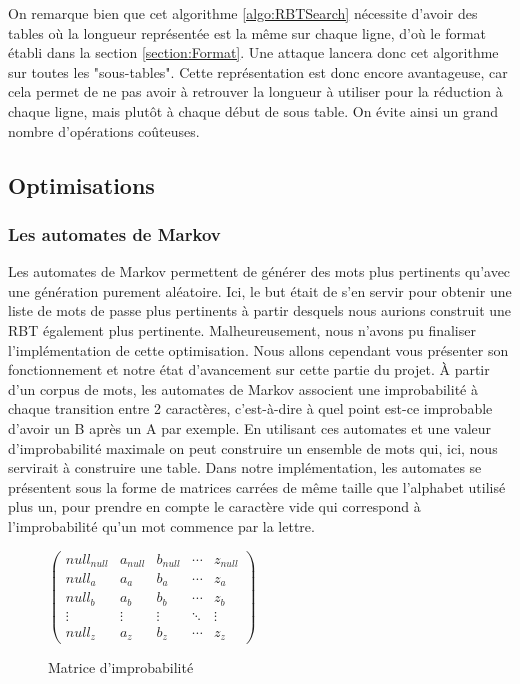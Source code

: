 \documentclass[french,12pt]{article}
\begin{document}
        \indent On remarque bien que cet algorithme \ref{algo:RBTSearch} nécessite d'avoir des tables où la longueur représentée est la même sur chaque ligne, d'où le format établi dans la section \ref{section:Format}. Une attaque lancera donc cet algorithme sur toutes les "sous-tables". Cette représentation est donc encore avantageuse, car cela permet de ne pas avoir à retrouver la longueur à utiliser pour la réduction à chaque ligne, mais plutôt à chaque début de sous table. On évite ainsi un grand nombre d'opérations coûteuses.
        \subsection{Optimisations}
         
       \subsubsection{Les automates de Markov}
       Les automates de Markov\cite{AutomatesMarkov} permettent de générer des mots plus pertinents qu'avec une génération purement aléatoire. Ici, le but était de s'en servir pour obtenir une liste de mots de passe plus pertinents à partir desquels nous aurions construit une RBT également plus pertinente. Malheureusement, nous n'avons pu finaliser l'implémentation de cette optimisation. Nous allons cependant vous présenter son fonctionnement et notre état d'avancement sur cette partie du projet. À partir d'un corpus de mots, les automates de Markov associent une improbabilité à chaque transition entre 2 caractères, c'est-à-dire à quel point est-ce improbable d'avoir un B après un A par exemple. En utilisant ces automates et une valeur d'improbabilité maximale on peut construire un ensemble de mots qui, ici, nous servirait à construire une table. 
       \newline
       \indent Dans notre implémentation, les automates se présentent sous la forme de matrices carrées de même taille que l'alphabet utilisé plus un, pour prendre en compte le caractère vide qui correspond à l'improbabilité qu'un mot commence par la lettre. 
       \begin{figure}[hbt!]
           \centering
             $\begin{pmatrix} 
                  \textit{null}_\textit{null} & a_\textit{null} & b_\textit{null} & \cdots & z_\textit{null} \\ 
                  \textit{null}_a & a_a & b_a & \cdots & z_a \\
                  \textit{null}_b & a_b & b_b & \cdots & z_b \\
                     \vdots & \vdots & \vdots & \ddots & \vdots \\
                  \textit{null}_z & a_z & b_z & \cdots & z_z        
            \end{pmatrix}$

             \caption{Matrice d'improbabilité}
       \end{figure}  
\end{document}
